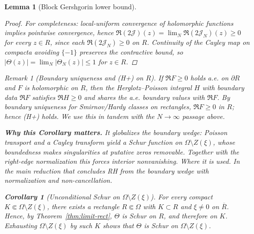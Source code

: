 \documentclass[11pt]{article}
\newtheorem{lemma}{Lemma}[section]
\newtheorem{corollary}{Corollary}[section]
\theoremstyle{definition}
\theoremstyle{remark}
\newtheorem{remark}{Remark}[section]
\begin{document}
\begin{lemma}[Block Gershgorin lower bound]
\begin{proof}
For completeness: local-uniform convergence of holomorphic functions implies pointwise convergence, hence $\Re(2\mathcal J)(z)=\lim_N \Re(2\mathcal J_N)(z)\ge 0$ for every $z\in R$, since each $\Re(2\mathcal J_N)\ge 0$ on $R$. Continuity of the Cayley map on compacta avoiding $\{-1\}$ preserves the contractive bound, so $|\Theta(z)|=\lim_N |\Theta_N(z)|\le 1$ for $z\in R$.
\end{proof}
\begin{remark}[Boundary uniqueness and (H+) on $R$]\label{rem:boundary-uniqueness}
If $\Re F\ge 0$ holds a.e. on $\partial R$ and $F$ is holomorphic on $R$, then the Herglotz–Poisson integral $H$ with boundary data $\Re F$ satisfies $\Re H\ge 0$ and shares the a.e. boundary values with $\Re F$. By boundary uniqueness for Smirnov/Hardy classes on rectangles, $\Re F\ge 0$ in $R$; hence (H+) holds. We use this in tandem with the $N\to\infty$ passage above.
\end{remark}




\vspace{1.0cm}
\noindent\textbf{Why this Corollary matters.} It globalizes the boundary wedge: Poisson transport and a Cayley transform yield a Schur function on $\Omega\setminus Z(\xi)$, whose boundedness makes singularities at putative zeros removable. Together with the right-edge normalization this forces interior nonvanishing.
\noindent\textit{Where it is used.} In the main reduction that concludes RH from the boundary wedge with normalization and non-cancellation.
\begin{corollary}[Unconditional Schur on \(\Omega\setminus Z(\xi)\)]\label{cor:Schur-off-zeros}
For every compact \(K\Subset \Omega\setminus Z(\xi)\), there exists a rectangle \(R\Subset\Omega\) with \(K\subset R\) and \(\xi\neq 0\) on \(\overline R\). Hence, by Theorem~\ref{thm:limit-rect}, \(\Theta\) is Schur on $R$, and therefore on $K$. Exhausting \(\Omega\setminus Z(\xi)\) by such \(K\) shows that \(\Theta\) is Schur on \(\Omega\setminus Z(\xi)\).
\end{corollary}





\end{lemma}
\end{document}
